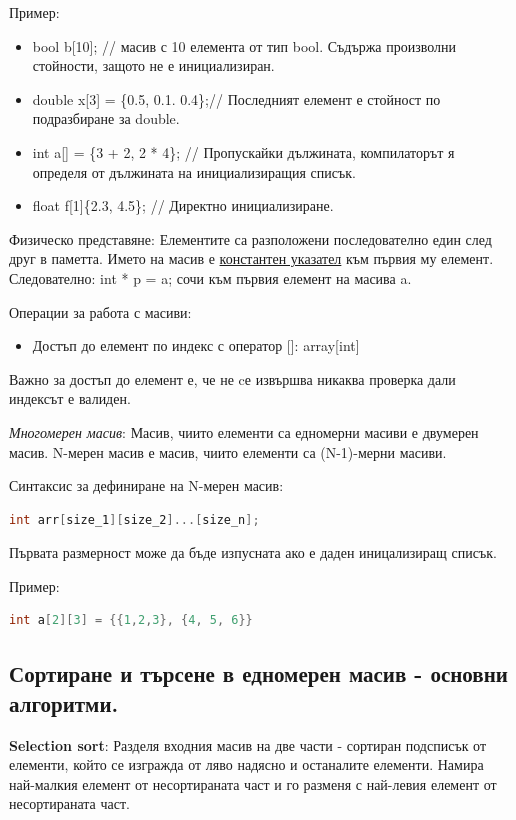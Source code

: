 \documentclass{article}
\renewcommand{\\}{\newline}
\begin{document}
Пример:
\begin{itemize}
  \item bool b[10]; // масив с 10 елемента от тип bool. Съдържа произволни стойности, защото не е инициализиран.
  \item double x[3] = \{0.5, 0.1. 0.4\};// Последният елемент е стойност по подразбиране за double.
  \item int a[] = \{3 + 2, 2 * 4\}; // Пропускайки дължината, компилаторът я определя от дължината на инициализиращия списък.
  \item float f[1]\{2.3, 4.5\}; // Директно инициализиране.
\end{itemize}

Физическо представяне: Елементите са разположени последователно един след друг в паметта. Името на масив е \underline{константен указател} към първия му елемент. Следователно: int * p = a; сочи към първия елемент на масива a.

Операции за работа с масиви: 
\begin{itemize}
  \item Достъп до елемент по индекс с оператор [\;]: array[int]
\end{itemize}

Важно за достъп до елемент е, че не cе извършва никаква проверка дали индексът е валиден.

\textit{Многомерен масив}: Масив, чиито елементи са едномерни масиви е двумерен масив. N-мерен масив е масив, чиито елементи са (N-1)-мерни масиви.

Синтаксис за дефиниране на N-мерен масив: 
\begin{lstlisting}[language=C++]
  int arr[size_1][size_2]...[size_n];
\end{lstlisting}

Първата размерност може да бъде изпусната ако е даден иницализиращ списък.

Пример:
\begin{lstlisting}[language=C++]
  int a[2][3] = {{1,2,3}, {4, 5, 6}}
\end{lstlisting}

\subsection{Сортиране и търсене в едномерен масив - основни алгоритми.}

\textbf{Selection sort}: Разделя входния масив на две части - сортиран подсписък от елементи, който се изгражда от ляво надясно и останалите елементи. Намира най-малкия елемент от несортираната част и го разменя с най-левия елемент от несортираната част. 
\end{document}
